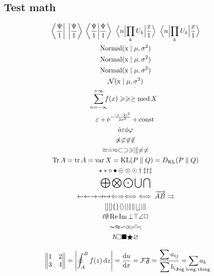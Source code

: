 \documentclass[a4paper,11pt]{article}
\begin{document}
  \subsection*{Test math}
    \begin{gather*}
      \bra{\frac{\Psi}{1}} \; \ket{\frac{\Psi}{1}} \;
      \braket{\frac{\Psi}{1}} \;
      \matrixelement{n}{\prod_k U_k}{\frac{x}{1}} \;
      \mel{n}{\prod_k U_k}{\frac{x}{1}} \\
      \text{Normal}(\mathrm{x} \mid \mu, \sigma^2 ) \\
      \textnormal{Normal}(\mathrm{x} \mid \mu, \sigma^2 ) \\
      \mathrm{Normal}(\mathrm{x} \mid \mu, \sigma^2 ) \\
      \mathcal{N}(\mathrm{x} \mid \mu, \sigma^2 ) \\
      \sum_{\mathclap{n=-\infty}}^{+\infty} f(x) \geqslant \geq \ge \med X \\
      \eps + \e^{-\frac{(x-2)^2}{2\sigma ^2}} + \const{} \\
      \dot{a} \epsilon \phi \varphi \\
      \not\propto \not\subset \not\in \notin \\
      \equiv \doteq \approx \subset \supset \ni \mid \parallel \neq \ne \\
      \Tr A = \tr A = \var X = \KL{P}{Q} = \DKL{P}{Q} \\
      \star \ast \circ \bullet \oplus \otimes \odot \dagger \ddagger \text{\dag \ddag} \\
      \bigoplus \bigotimes \bigodot \bigcup \bigcap \\
      \leftarrow \gets \rightarrow \to \mapsto
      \Leftarrow \Rightarrow \Longleftrightarrow \iff \overrightarrow{AB} \rightrightarrows \\
      []\lbrack \rbrack \lbrace \rbrace \langle \rangle
      | \vert \| \Vert \lfloor \rfloor \arrowvert \Arrowvert \\
      \ell \emptyset \Re \Im \bot \top \angle \Box \\
      \thicksim \thickapprox \backsim \varpropto \risingdotseq \fallingdotseq \\
      \hbar \square \blacksquare \bigstar \varnothing
    \end{gather*}

    \begin{equation}
      \begin{Vmatrix}
        1 & 2 \\
        3 & 4
      \end{Vmatrix}
      =
      \abs{\oint_{A}^{B} f(z) \ud z}
      =
      \frac{\d u}{\d x}
      = \mathcal{F}\mathfrak{F}
      = \frac{\displaystyle \sum a_{ij} }{\displaystyle \sum b_{ij} }
      = \sum_{\mathclap{\text{big long thing}}} a_k
    \end{equation}
\end{document}
